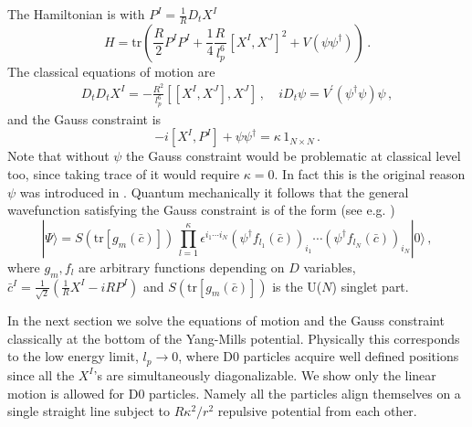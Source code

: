 \documentclass[a4paper,12pt]{article}
\def\tr{\mbox{tr}}
\begin{document}
The Hamiltonian is  with $P^{I}=\frac{1}{R}D_{t}X^{I}$
\begin{equation}
H=\tr{\left(\textstyle{\frac{R}{2}}P^{I}P^{I} +\textstyle{\frac{1}{4}\frac{R\,}{l_{p}^{6}}}[X^{I},X^{J}]^{2}
+V(\psi\psi^{\dagger})\right)}\,.
\label{H}
\end{equation}
The classical equations of motion are
\begin{equation}
\begin{array}{cc}
D_{t}D_{t}X^{I}=-\textstyle{\frac{R^{2}}{l_{p}^{6}}}[[X^{I},X^{J}],X^{J}]\,,&~iD_{t}\psi=V^{\prime}(\psi^{\dagger}\psi)\psi\,,
\end{array}
\label{em}
\end{equation}
and the Gauss constraint is
\begin{equation}
-i[X^{I},P^{I}]+\psi\psi^{\dagger}=\kappa\,1_{N\times N}\,. \label{Gauss}
\end{equation}
Note that without $\psi$ the Gauss constraint would be  problematic at classical level too, since taking trace of
it would require $\kappa=0$. In fact this is the original reason  $\psi$ was introduced in \cite{0103013}. Quantum
mechanically it follows that the general wavefunction  satisfying the Gauss constraint is of the form (see e.g.
\cite{0103179})
\begin{equation}
|\Psi\rangle=S\left(\tr [g_{m}(\bar{c})]\right)\,\displaystyle{\prod_{l=1}^{\kappa}\epsilon^{i_{1}\cdots
i_{N}}(\psi^{\dagger}f_{l_{1}}(\bar{c}))_{i_{1}}\cdots(\psi^{\dagger}f_{l_{N}}(\bar{c}))_{i_{N}}}|0\rangle\,,
\label{wvf}
\end{equation}
where $g_{m},f_{l}$ are arbitrary functions depending on $D$ variables,
$\bar{c}^{I}=\frac{1}{\sqrt{2}}(\frac{1}{R}X^{I}-i{\scriptstyle R}P^{I})$ and $S\left(\tr [g_{m}(\bar{c})]\right)$
is the U($N$) singlet part.\newline











In the next section  we solve the equations of motion and the Gauss constraint classically at the bottom of the
Yang-Mills potential. Physically this corresponds to the low energy limit, $l_{p}\rightarrow 0$,
where D0 particles acquire well defined positions since all the $X^{I}$'s are simultaneously diagonalizable. We show only
the linear motion is allowed for D0 particles.  Namely all the particles align themselves on a single straight
line subject to ${\scriptstyle R}\kappa^{2}/r^2$ repulsive potential from each other.
\end{document}
